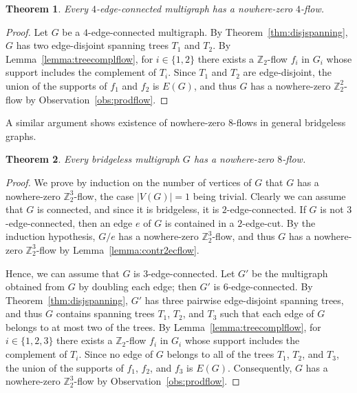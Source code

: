 \documentclass[12pt,twoside,openright,a4paper]{book}
\newtheorem{theorem}{Theorem}[chapter]
\begin{document}
\begin{theorem}
Every $4$-edge-connected multigraph has a nowhere-zero $4$-flow.
\end{theorem}
\begin{proof}
Let $G$ be a $4$-edge-connected multigraph.  By Theorem~\ref{thm:disjspanning}, $G$ has two edge-disjoint spanning trees $T_1$ and $T_2$.
By Lemma~\ref{lemma:treecomplflow}, for $i\in\{1,2\}$ there exists a $\mathbb{Z}_2$-flow $f_i$ in $G_i$ whose support includes the complement of $T_i$.
Since $T_1$ and $T_2$ are edge-disjoint, the union of the supports of $f_1$ and $f_2$ is $E(G)$, and thus
$G$ has a nowhere-zero $\mathbb{Z}_2^2$-flow by Observation~\ref{obs:prodflow}.
\end{proof}

A similar argument shows existence of nowhere-zero $8$-flows in general bridgeless graphs.
\begin{theorem}\label{thm:8flow}
Every bridgeless multigraph $G$ has a nowhere-zero $8$-flow.
\end{theorem}
\begin{proof}
We prove by induction on the number of vertices of $G$ that $G$ has a nowhere-zero $\mathbb{Z}_2^3$-flow, the case $|V(G)|=1$ being trivial.
Clearly we can assume that $G$ is connected, and since it is bridgeless, it is $2$-edge-connected.
If $G$ is not $3$-edge-connected, then an edge $e$ of $G$ is contained in a $2$-edge-cut.
By the induction hypothesis, $G/e$ has a nowhere-zero $\mathbb{Z}_2^3$-flow, and thus $G$ has a nowhere-zero $\mathbb{Z}_2^3$-flow by
Lemma~\ref{lemma:contr2ecflow}.

Hence, we can assume that $G$ is $3$-edge-connected.  Let $G'$ be the multigraph obtained from $G$ by doubling each edge;
then $G'$ is $6$-edge-connected.  By Theorem~\ref{thm:disjspanning}, $G'$ has three pairwise edge-disjoint spanning trees,
and thus $G$ contains spanning trees $T_1$, $T_2$, and $T_3$ such that each edge of $G$ belongs to at most two of the trees.
By Lemma~\ref{lemma:treecomplflow}, for $i\in\{1,2,3\}$ there exists a $\mathbb{Z}_2$-flow $f_i$ in $G_i$ whose support includes the complement of $T_i$.
Since no edge of $G$ belongs to all of the trees $T_1$, $T_2$, and $T_3$, the union of the supports of $f_1$, $f_2$, and $f_3$ is $E(G)$.
Consequently, $G$ has a nowhere-zero $\mathbb{Z}_2^3$-flow by Observation~\ref{obs:prodflow}.
\end{proof}
\end{document}
